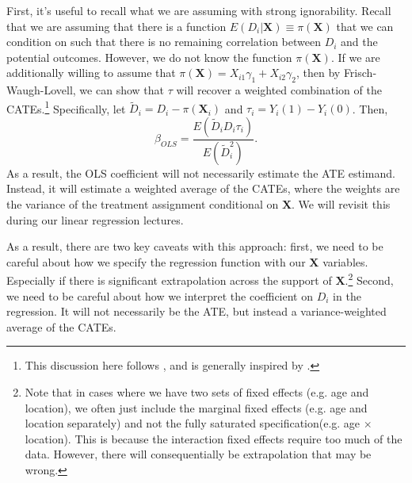 \documentclass{tufte-handout}
\theoremstyle{break}
\newcommand{\bX}{\mathbf{X}}
\begin{document}
First, it's useful to recall what we are assuming with strong ignorability. Recall that we are assuming that there is a function $E(D_{i} | \bX) \equiv \pi(\bX)$ that we can condition on such that there is no remaining correlation between $D_{i}$ and the potential outcomes. However, we do not know the function $\pi(\bX)$. If we are additionally willing to assume that $\pi(\bX) = X_{i1}\gamma_{1} + X_{i2}\gamma_{2}$, then by Frisch-Waugh-Lovell, we can show that $\tau$ will recover a weighted combination of the CATEs.\footnote{This discussion here follows \citet{angrist1998}, and is generally inspired by \citet{borusyak2024negative}.} Specifically, let $\tilde{D}_{i} = D_{i} - \pi(\bX_{i})$ and $\tau_{i} = Y_{i}(1) - Y_{i}(0)$. Then,
\begin{equation}
  \label{eq:ols_frac}
  \beta_{OLS} = \frac{E(\tilde{D}_{i}D_{i}\tau_{i})}{E(\tilde{D}_{i}^{2})}.
\end{equation}
As a result, the OLS coefficient will not necessarily estimate the ATE estimand. Instead, it will estimate a weighted average of the CATEs, where the weights are the variance of the treatment assignment conditional on $\bX$. We will revisit this during our linear regression lectures.

As a result, there are two key caveats with this approach: first, we need to be careful about how we specify the regression function with our $\bX$ variables. Especially if there is significant extrapolation across the support of $\bX$.\footnote{Note that in cases where we have two sets of fixed effects (e.g. age and location), we often just include the marginal fixed effects (e.g. age and location separately) and not the fully saturated specification(e.g. age $\times$ location). This is because the interaction fixed effects require too much of the data. However, there will consequentially be extrapolation that may be wrong.} Second, we need to be careful about how we interpret the coefficient on $D_{i}$ in the regression. It will not necessarily be the ATE, but instead a variance-weighted average of the CATEs. 
\end{document}

